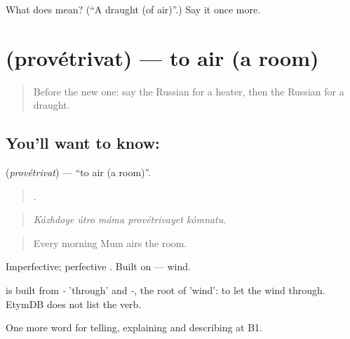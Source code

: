 \begin{tcolorbox}[breakable,colback=teal!4,colframe=teal!35!black,title={Before you move on}]
What does  mean? (\textquotedblleft{}A draught (of air)\textquotedblright{}.) Say it once more.
\end{tcolorbox}
\section[\texorpdfstring{\ru{проветривать} (provétrivat)}{проветривать (provétrivat)}]{ (provétrivat) — to air (a room)}

\label{lesson:RU-C431-provetrivat}



\begin{quote}
Before the new one: say the Russian for a heater, then the Russian for a draught.
\end{quote}

\subsection*{You'll want to know: }
\textbf{} (\emph{provétrivat}) — \textquotedblleft{}to air (a room)\textquotedblright{}.

\begin{quote}
    .
\end{quote}

\begin{quote}
\emph{Kázhdoye útro máma provétrivayet kómnatu.}
\end{quote}

\begin{quote}
Every morning Mum airs the room.
\end{quote}

Imperfective; perfective \emph{}. Built on \emph{} — wind.

\begin{cousinweb}
\emph{} is built from \emph{-} 'through' and \emph{-}, the root of \emph{} 'wind': to let the wind through. EtymDB does not list the verb.
\end{cousinweb}

\begin{grammarlens}[title={What you've built}]
One more word for telling, explaining and describing at B1.
\end{grammarlens}


